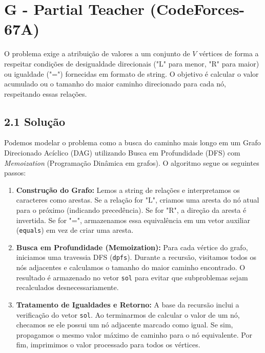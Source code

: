 \documentclass[12pt,a4paper]{article}
\begin{document}
\section{G - Partial Teacher (CodeForces-67A)}
O problema exige a atribuição de valores a um conjunto de $V$ vértices de forma a respeitar condições de desigualdade direcionais ("L" para menor, "R" para maior) ou igualdade ("=") fornecidas em formato de string. O objetivo é calcular o valor acumulado ou o tamanho do maior caminho direcionado para cada nó, respeitando essas relações.

\subsection*{2.1 Solução}
Podemos modelar o problema como a busca do caminho mais longo em um Grafo Direcionado Acíclico (DAG) utilizando Busca em Profundidade (DFS) com \textit{Memoization} (Programação Dinâmica em grafos). O algoritmo segue os seguintes passos:

\begin{enumerate}
    \item \textbf{Construção do Grafo:} Lemos a string de relações e interpretamos os caracteres como arestas. Se a relação for "L", criamos uma aresta do nó atual para o próximo (indicando precedência). Se for "R", a direção da aresta é invertida. Se for "=", armazenamos essa equivalência em um vetor auxiliar (\texttt{equals}) em vez de criar uma aresta.
    \item \textbf{Busca em Profundidade (Memoization):} Para cada vértice do grafo, iniciamos uma travessia DFS (\texttt{dpfs}). Durante a recursão, visitamos todos os nós adjacentes e calculamos o tamanho do maior caminho encontrado. O resultado é armazenado no vetor \texttt{sol} para evitar que subproblemas sejam recalculados desnecessariamente.
    \item \textbf{Tratamento de Igualdades e Retorno:} A base da recursão inclui a verificação do vetor \texttt{sol}. Ao terminarmos de calcular o valor de um nó, checamos se ele possui um nó adjacente marcado como igual. Se sim, propagamos o mesmo valor máximo de caminho para o nó equivalente. Por fim, imprimimos o valor processado para todos os vértices.
\end{enumerate}
\end{document}
